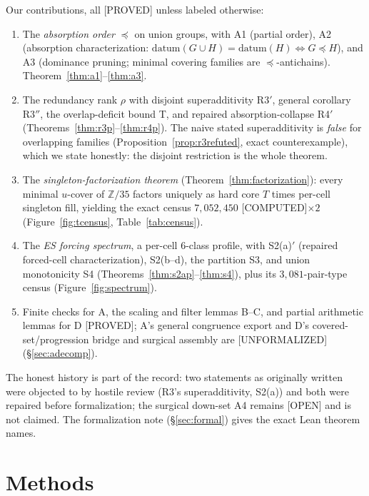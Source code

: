 \documentclass[11pt,a4paper]{article}
\theoremstyle{definition}
\begin{document}
Our contributions, all [PROVED] unless labeled otherwise:
\begin{enumerate}
\item The \emph{absorption order} $\preceq$ on union groups, with A1 (partial
  order), A2 (absorption characterization: $\text{datum}(G\cup H)=\text{datum}(H)
  \iff G\preceq H$), and A3 (dominance pruning; minimal covering families
  are $\preceq$-antichains).
  Theorem~\ref{thm:a1}--\ref{thm:a3}.
\item The redundancy rank $\rho$ with disjoint superadditivity R3$'$,
  general corollary R3$''$, the overlap-deficit bound T, and repaired
  absorption-collapse R4$'$ (Theorems~\ref{thm:r3p}--\ref{thm:r4p}).
  The naive stated superadditivity is \emph{false} for overlapping families
  (Proposition~\ref{prop:r3refuted}, exact counterexample), which we state
  honestly: the disjoint restriction is the whole theorem.
\item The \emph{singleton-factorization theorem}
  (Theorem~\ref{thm:factorization}): every minimal $u$-cover of
  $\mathbb{Z}/35$ factors uniquely as hard core $T$ times per-cell singleton
  fill, yielding the exact census $7{,}052{,}450$ [COMPUTED]$\times2$
  (Figure~\ref{fig:tcensus}, Table~\ref{tab:census}).
\item The \emph{ES forcing spectrum}, a per-cell $6$-class profile, with
  S2(a)$'$ (repaired forced-cell characterization), S2(b--d), the partition
  S3, and union monotonicity S4 (Theorems~\ref{thm:s2ap}--\ref{thm:s4}),
  plus its $3{,}081$-pair-type census (Figure~\ref{fig:spectrum}).
\item Finite checks for A, the scaling and filter lemmas B--C, and partial
  arithmetic lemmas for D [PROVED]; A's general congruence export and D's
  covered-set/progression bridge and surgical assembly are [UNFORMALIZED]
  (\S\ref{sec:adecomp}).
\end{enumerate}

The honest history is part of the record: two statements as originally
written were objected to by hostile review (R3's superadditivity, S2(a)) and
both were repaired before formalization; the surgical down-set A4 remains
[OPEN] and is not claimed.  The formalization note (\S\ref{sec:formal})
gives the exact Lean theorem names.

\section{Methods}
\end{document}
